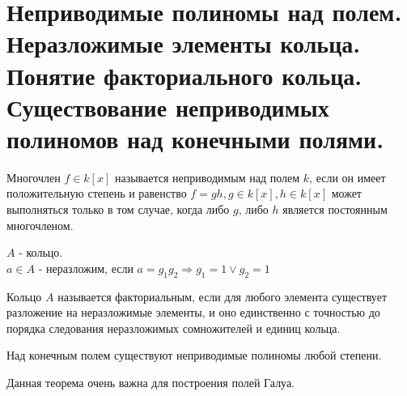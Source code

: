\section{Неприводимые полиномы над полем. Неразложимые элементы кольца. Понятие факториального кольца. Существование
неприводимых полиномов над конечными полями.}

\begin{defn}
Многочлен $f \in k[x]$ называется неприводимым над полем $k$, если он имеет положительную степень и равенство
$f = gh, g \in k[x], h \in k[x]$ может выполняться только в том случае, когда либо $g$, либо $h$ является постоянным
многочленом.
\end{defn}

\begin{defn}
$A$ - кольцо. \\
$a \in A$ - неразложим, если $a = g_1g_2 \Rightarrow g_1 = 1 \vee g_2 = 1$
\end{defn}

\begin{defn}
Кольцо $A$ называется факториальным, если для любого элемента существует разложение на неразложимые элементы, и оно
единственно с точностью до порядка следования неразложимых сомножителей и единиц кольца.
\end{defn}

\begin{thm}
Над конечным полем существуют неприводимые полиномы любой степени.
\end{thm}

Данная теорема очень важна для построения полей Галуа.